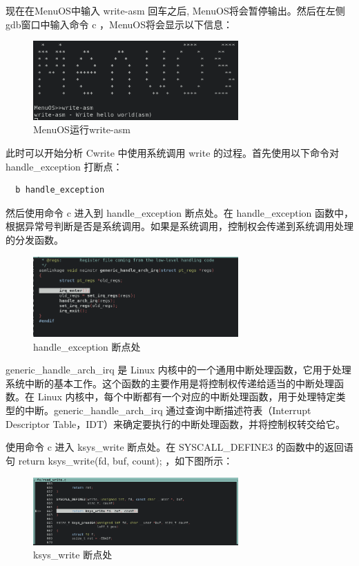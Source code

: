 \documentclass[lang=cn,10pt]{elegantbook}
\begin{document}
现在在MenuOS中输入  write-asm 回车之后, MenuOS将会暂停输出。然后在左侧gdb窗口中输入命令 c ，MenuOS将会显示以下信息：
\begin{figure}[htbp]
  \centering
  \includegraphics[width=0.7\textwidth]{image/image-20231106162854338.png}
  \caption{MenuOS运行write-asm}
\end{figure}

此时可以开始分析 Cwrite 中使用系统调用 write 的过程。首先使用以下命令对 handle\_exception 打断点：

\begin{lstlisting}
  b handle_exception
\end{lstlisting}

然后使用命令 c 进入到 handle\_exception 断点处。在 handle\_exception 函数中，根据异常号判断是否是系统调用。如果是系统调用，控制权会传递到系统调用处理的分发函数。
\begin{figure}[htbp]
  \centering
  \includegraphics[width=0.7\textwidth]{image/image-20231111184909752.png}
  \caption{handle\_exception 断点处}
\end{figure}

generic\_handle\_arch\_irq 是 Linux 内核中的一个通用中断处理函数，它用于处理系统中断的基本工作。这个函数的主要作用是将控制权传递给适当的中断处理函数。在 Linux 内核中，每个中断都有一个对应的中断处理函数，用于处理特定类型的中断。generic\_handle\_arch\_irq 通过查询中断描述符表（Interrupt Descriptor Table，IDT）来确定要执行的中断处理函数，并将控制权转交给它。

使用命令 c 进入 ksys\_write 断点处。在 SYSCALL\_DEFINE3 的函数中的返回语句 return ksys\_write(fd, buf, count);  ，如下图所示：
\begin{figure}[htbp]
  \centering
  \includegraphics[width=0.7\textwidth]{image/image-20231106162942747.png}
  \caption{ksys\_write 断点处}
\end{figure}
\end{document}
